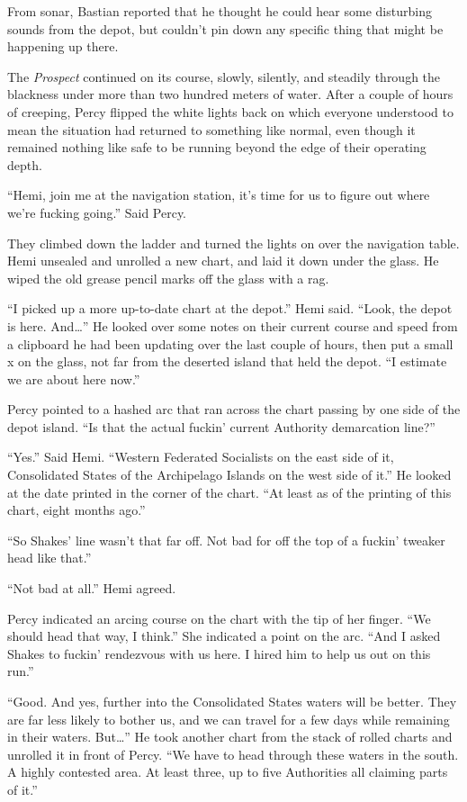 \documentclass[
]{scrbook}
\begin{document}
From sonar, Bastian reported that he thought he could hear some
disturbing sounds from the depot, but couldn't pin down any specific
thing that might be happening up there.

The \emph{Prospect} continued on its course, slowly, silently, and
steadily through the blackness under more than two hundred meters of
water. After a couple of hours of creeping, Percy flipped the white
lights back on which everyone understood to mean the situation had
returned to something like normal, even though it remained nothing like
safe to be running beyond the edge of their operating depth.

``Hemi, join me at the navigation station, it's time for us to figure
out where we're fucking going.'' Said Percy.

They climbed down the ladder and turned the lights on over the
navigation table. Hemi unsealed and unrolled a new chart, and laid it
down under the glass. He wiped the old grease pencil marks off the glass
with a rag.

``I picked up a more up-to-date chart at the depot.'' Hemi said. ``Look,
the depot is here. And\ldots{}'' He looked over some notes on their
current course and speed from a clipboard he had been updating over the
last couple of hours, then put a small x on the glass, not far from the
deserted island that held the depot. ``I estimate we are about here
now.''

Percy pointed to a hashed arc that ran across the chart passing by one
side of the depot island. ``Is that the actual fuckin' current Authority
demarcation line?''

``Yes.'' Said Hemi. ``Western Federated Socialists on the east side of
it, Consolidated States of the Archipelago Islands on the west side of
it.'' He looked at the date printed in the corner of the chart. ``At
least as of the printing of this chart, eight months ago.''

``So Shakes' line wasn't that far off. Not bad for off the top of a
fuckin' tweaker head like that.''

``Not bad at all.'' Hemi agreed.

Percy indicated an arcing course on the chart with the tip of her
finger. ``We should head that way, I think.'' She indicated a point on
the arc. ``And I asked Shakes to fuckin' rendezvous with us here. I
hired him to help us out on this run.''

``Good. And yes, further into the Consolidated States waters will be
better. They are far less likely to bother us, and we can travel for a
few days while remaining in their waters. But\ldots{}'' He took another
chart from the stack of rolled charts and unrolled it in front of Percy.
``We have to head through these waters in the south. A highly contested
area. At least three, up to five Authorities all claiming parts of it.''
\end{document}

